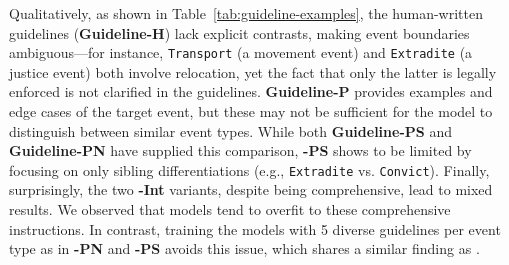 Qualitatively, as shown in Table~\ref{tab:guideline-examples}, the human-written guidelines (\textbf{Guideline-H}) lack explicit contrasts, making event boundaries ambiguous—for instance, \texttt{Transport} (a movement event) and \texttt{Extradite} (a justice event) both involve relocation, yet the fact that only the latter is legally enforced is not clarified in the guidelines.
\textbf{Guideline-P} provides examples and edge cases of the target event, but these may not be sufficient for the model to distinguish between similar event types. While both \textbf{Guideline-PS} and \textbf{Guideline-PN} have supplied this comparison, \textbf{-PS} shows to be limited by focusing on only sibling differentiations (e.g., \texttt{Extradite} vs. \texttt{Convict}). Finally, surprisingly, the two \textbf{-Int} variants, despite being comprehensive, lead to mixed results. We observed that models tend to overfit to these comprehensive instructions. In contrast, training the models with 5 diverse guidelines per event type as in \textbf{-PN} and \textbf{-PS} avoids this issue, which shares a similar finding as \citet{cai-etal-2024-improving-event, sainz2024gollie}.


